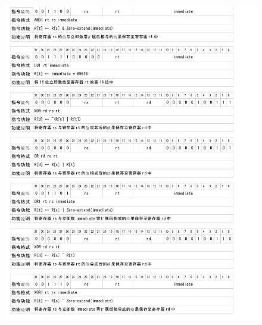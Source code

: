     \begin{figure}[!hbp]
            \centering
            \includegraphics[width=\textwidth]{chart/insert5.jpg}
    \end{figure}


